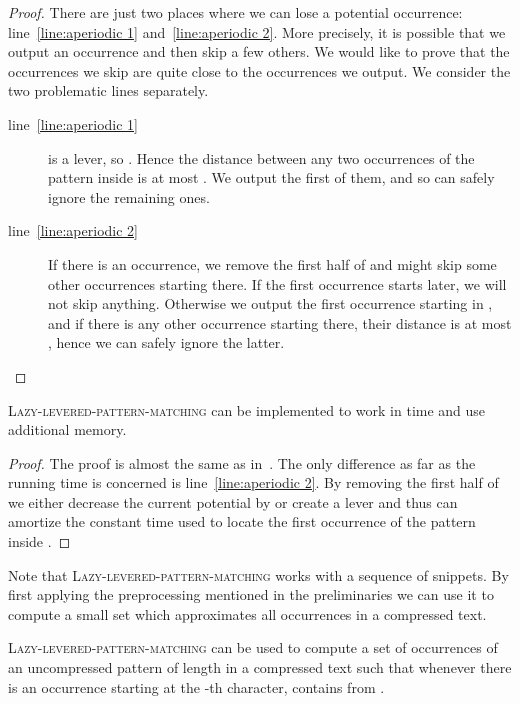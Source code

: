 \documentclass[runningheads]{llncs}
\newcommand{\proc}[1]{\textnormal{\scshape#1}}
\begin{document}
\begin{proof}
There are just two places where we can lose a potential occurrence: line~\ref{line:aperiodic 1} and~\ref{line:aperiodic 2}. More precisely,
it is possible that we output an occurrence and then skip a few others. We would like to prove that the occurrences we skip are quite close
to the occurrences we output. We consider the two problematic lines separately.
\begin{description}
\item[line~\ref{line:aperiodic 1}]  is a lever, so . Hence the distance between any two occurrences
of the pattern inside  is at most . We output the first of them, and so can safely ignore the
remaining ones.
\item[line~\ref{line:aperiodic 2}] If there is an occurrence, we remove the first half of  and might skip some other occurrences starting
there. If the first occurrence starts later, we will not skip anything. Otherwise we output the first occurrence starting in ,
and if there is any other occurrence starting there, their distance is at most , hence we can safely ignore the latter.
\end{description}
\end{proof}



\begin{lemma}
\label{lemma:aperiodic time}
\proc{Lazy-levered-pattern-matching} can be implemented to work in time  and use  additional memory.
\end{lemma}

\begin{proof}
The proof is almost the same as in~\cite{GawrychowskiLZW}. The only difference as far as the running time is concerned is
line~\ref{line:aperiodic 2}. By removing the first half of  we either decrease the current potential by  or create a lever and thus can amortize the constant time used to locate the first occurrence of the pattern inside .
\end{proof}

Note that \proc{Lazy-levered-pattern-matching} works with a sequence of snippets. By first applying the preprocessing mentioned in
the preliminaries we can use it to compute a small set which approximates all occurrences in a compressed text.

\begin{lemma}\label{lemma:set of occurrences}
\proc{Lazy-levered-pattern-matching} can be used to compute a set  of  occurrences of an uncompressed pattern of length  in a compressed text such that whenever there is an occurrence starting at the -th character,  contains  from .
\end{lemma}
\end{document}
